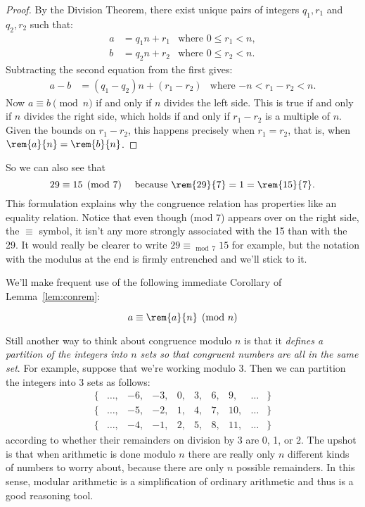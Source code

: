 \begin{proof}
By the Division Theorem, there exist unique pairs of integers $q_1, r_1$
and $q_2, r_2$ such that:
%
\begin{align*}
a & = q_1 n + r_1 & \text{where $0 \leq r_1 < n$}, \\
b & = q_2 n + r_2 & \text{where $0 \leq r_2 < n$}.
\end{align*}
%
Subtracting the second equation from the first gives:
%
\begin{align*}
a - b & = (q_1 - q_2) n + (r_1 - r_2)
  & \text{where $-n < r_1 - r_2 < n$}.
\end{align*}
%
Now $a \equiv b \pmod{n}$ if and only if $n$ divides the left side.
This is true if and only if $n$ divides the right side, which holds if
and only if $r_1 - r_2$ is a multiple of $n$.  Given the bounds on
$r_1 - r_2$, this happens precisely when $r_1 = r_2$, that is, when
$\rem{a}{n} = \rem{b}{n}$.
\end{proof}

So we can also see that
\[
29 \equiv 15 \pmod{7} \quad\text{ because } \rem{29}{7} = 1 = \rem{15}{7}.
\]
This formulation explains why the congruence relation has properties
like an equality relation.  Notice that even though (mod 7) appears
over on the right side, the $\equiv$ symbol, it isn't any more strongly
associated with the 15 than with the 29.  It would really be clearer
to write $29 \equiv_{\mod 7} 15$ for example, but the notation with
the modulus at the end is firmly entrenched and we'll stick to it.

We'll make frequent use of the following immediate Corollary of
Lemma~\ref{lem:conrem}:
\begin{corollary}\label{aran}
\[
a \equiv \rem{a}{n} \pmod{n}
\]
\end{corollary}

Still another way to think about congruence modulo $n$ is that it
\emph{defines a partition of the integers into $n$ sets so that congruent
numbers are all in the same set}.  For example, suppose that we're working
modulo 3.  Then we can partition the integers into 3 sets as follows:
%
\[
\begin{array}{cccccccccc}
\{ & \dots, & -6, & -3, & 0, & 3, & 6, & 9, & \dots & \} \\
\{ & \dots, & -5, & -2, & 1, & 4, & 7, & 10, & \dots & \} \\
\{ & \dots, & -4, & -1, & 2, & 5, & 8, & 11, & \dots & \}
\end{array}
\]
according to whether their remainders on division by 3 are 0, 1, or 2.
The upshot is that when arithmetic is done modulo $n$ there are really
only $n$ different kinds of numbers to worry about, because there are only
$n$ possible remainders.  In this sense, modular arithmetic is a
simplification of ordinary arithmetic and thus is a good reasoning tool.

